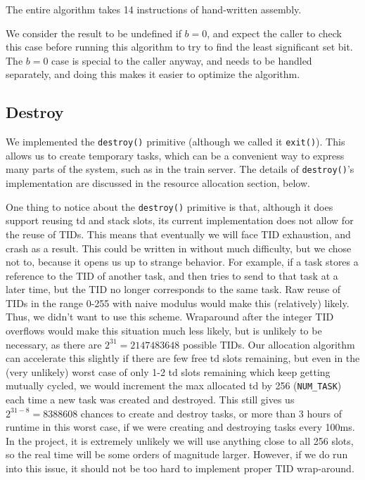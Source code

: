 \documentclass[titlepage]{article}
\begin{document}
The entire algorithm takes 14 instructions of hand-written assembly.

We consider the result to be undefined if $b=0$, and expect the caller to check
this case before running this algorithm to try to find the least significant set bit.
The $b=0$ case is special to the caller anyway, and needs to be handled separately,
and doing this makes it easier to optimize the algorithm.

\subsection{Destroy}
We implemented the \texttt{destroy()} primitive (although we called it
\texttt{exit()}).
This allows us to create temporary tasks, which can be a convenient way to
express many parts of the system, such as in the train server. The details of
\texttt{destroy()}'s implementation are discussed in the resource allocation
section, below.

One thing to notice about the \texttt{destroy()} primitive is that, although
it does support reusing td and stack slots, its current implementation does
not allow for the reuse of TIDs. This means that eventually we will face TID
exhaustion, and crash as a result. This could be written in without much
difficulty, but we chose not to, because it opens us up to strange behavior.
For example, if a task stores a reference to the TID of another task, and then
tries to send to that task at a later time, but the TID no longer corresponds
to the same task. Raw reuse of TIDs in the range 0-255 with naive modulus
would make this (relatively) likely. Thus, we didn't want to use this scheme.
Wraparound after the integer TID overflows would make this situation much less
likely, but is unlikely to be necessary, as there are $2^{31} = 2147483648$
possible TIDs. Our allocation algorithm can accelerate this slightly if there
are few free td slots remaining, but even in the (very unlikely) worst case of
only 1-2 td slots remaining which keep getting mutually cycled, we would
increment the max allocated td by 256 (\texttt{NUM\_TASK}) each time a new
task was created and destroyed. This still gives us $2^{31 - 8} = 8388608$
chances to create and destroy tasks, or more than 3 hours of runtime in this
worst case, if we were creating and destroying tasks every 100ms. In the
project, it is extremely unlikely we will use anything close to all 256 slots,
so the real time will be some orders of magnitude larger. However, if we do
run into this issue, it should not be too hard to implement proper TID
wrap-around.
\end{document}
